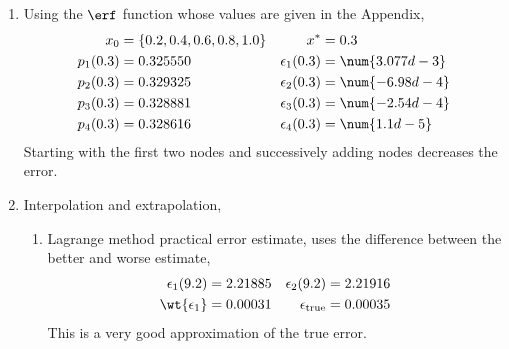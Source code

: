 \begin{enumerate}
    \item Using the $ \erf $ function whose values are given in the Appendix,
          \begin{align}
              x_0             & = \{0.2, 0.4, 0.6, 0.8, 1.0\} &
              x^*             & = 0.3                           \\
              p_1(0.3)        & = 0.325550                    &
              \epsilon_1(0.3) & = \num{3.077d-3}                \\
              p_2(0.3)        & = 0.329325                    &
              \epsilon_2(0.3) & = \num{-6.98d-4}                \\
              p_3(0.3)        & = 0.328881                    &
              \epsilon_3(0.3) & = \num{-2.54d-4}                \\
              p_4(0.3)        & = 0.328616                    &
              \epsilon_4(0.3) & = \num{1.1d-5}
          \end{align}
          Starting with the first two nodes and successively adding nodes decreases the
          error.

    \item Interpolation and extrapolation,
          \begin{enumerate}
              \item Lagrange method practical error estimate, uses the difference between
                    the better and worse estimate,
                    \begin{align}
                        \epsilon_1(9.2)        & = 2.21885 &
                        \epsilon_2(9.2)        & = 2.21916   \\
                        \wt{\epsilon_1}        & = 0.00031 &
                        \epsilon_{\text{true}} & = 0.00035
                    \end{align}
                    This is a very good approximation of the true error.


\end{enumerate}
\end{enumerate}
